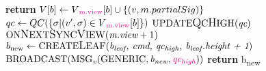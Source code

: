 \begin{algorithm}[h!]
\begin{algorithmic}[1]
		\EndIf
		\color{black}
	\EndProcedure
	 \label{code_onreceivevote}
		\color{Green}
		 \label{code_checkleader}
			\color{black}
				\State \textbf{return}
			\EndIf
			\State $V[b] \gets V\textcolor{Magenta}{\textsubscript{m.view}}[b] \cup \{(v, m.partialSig)\}$
				\State $qc \gets QC(\{ \sigma | (v', \sigma) \in V\textcolor{Magenta}{\textsubscript{m.view}}[b]\})$
				\State $ \text{UPDATE{\large Q}C{\large H}IGH}(\textit{qc}) $
				\color{Green}
				\State $\text{ON{\large N}EXT{\large S}YNC{\large V}IEW}(\textit{m.view} + 1)$ \label{code_gotvotes}
				\color{black}
			\EndIf
		\EndIf
	\EndProcedure
	 \label{code_onpropose}
		\State $b\textsubscript{new} \gets \text{CREATE{\large L}EAF}(\textit{b\textsubscript{leaf}, \textit{cmd}, \textit{qc\textsubscript{high}}, \textit{b\textsubscript{leaf}.height} + 1})$
		\State $ \text{BROADCAST}(\text{MSG}\textsubscript{\textit{v}}(\text{GENERIC}, \textit{b\textsubscript{new}}, \textcolor{Magenta}{\textit{qc\textsubscript{high}}})) $ \label{code_propose}
		\State \textbf{return} b\textsubscript{new}
	\EndFunction
	\end{algorithmic}
\end{algorithm}

